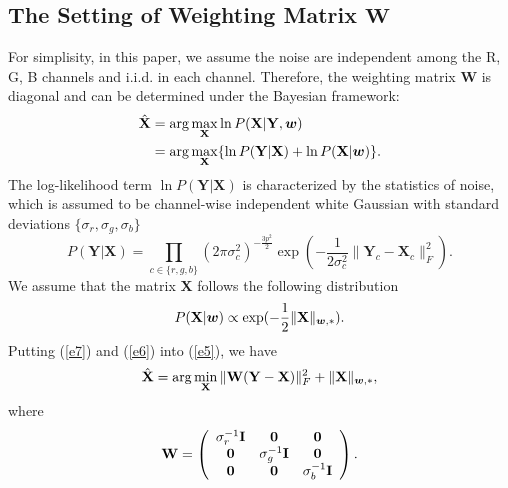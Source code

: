 \documentclass[10pt,twocolumn,letterpaper,sort&compress]{article}
\begin{document}
\subsection{The Setting of Weighting Matrix $\mathbf{W}$}
For simplisity, in this paper, we assume the noise are independent among the R, G, B channels and i.i.d. in each channel. Therefore, the weighting matrix $\mathbf{W}$ is diagonal and can be determined under the Bayesian framework:
\vspace{-1mm}
\begin{equation}
\label{e5}
\vspace{-1mm}
\begin{split}
\hat{\mathbf{X}} 
&=
\arg\max_{\mathbf{X}}\ln P(\mathbf{X}|\mathbf{Y},\bm{w})
\\
&
=
\arg\max_{\mathbf{X}}\{\ln P(\mathbf{Y}|\mathbf{X})+\ln P(\mathbf{X}|\bm{w})\}.
\end{split}
\end{equation}
The log-likelihood term $\ln P(\mathbf{Y}|\mathbf{X})$ is characterized by the
statistics of noise, which is assumed to be channel-wise independent white Gaussian with standard deviations $\{\sigma_{r}, \sigma_{g}, \sigma_{b}\}$
\vspace{-1mm}
\begin{equation}
\label{e6}
P(\mathbf{Y}|\mathbf{X}) 
= 
\prod_{c\in\{r, g, b\}}
(2\pi\sigma_{c}^{2})^{-\frac{3p^{2}}{2}}
\exp(-\frac{1}{2\sigma_{c}^{2}}\|\mathbf{Y}_{c}-\mathbf{X}_{c}\|_{F}^{2}).
\end{equation}
We assume that the matrix $\mathbf{X}$ follows the following distribution
\vspace{-1mm}
\begin{equation}
\label{e7}
\vspace{-1mm}
P(\mathbf{X}|\bm{w})
\propto
\exp(-\frac{1}{2}\|\mathbf{X}\|_{\bm{w},*}).
\end{equation}
Putting (\ref{e7}) and (\ref{e6}) into (\ref{e5}), we have
\vspace{-1mm}
\begin{equation}
\vspace{-1mm}
\hat{\mathbf{X}}=\arg\min_{\mathbf{X}}\|\mathbf{W}(\mathbf{Y}-\mathbf{X})\|_{F}^{2}+\|\mathbf{X}\|_{\bm{w},*},
\end{equation}
where
\begin{equation}
\label{e9}
\vspace{-1mm}
\mathbf{W}
=
\left( \begin{array}{ccc}
\sigma_{r}^{-1}\mathbf{I} & \mathbf{0} & \mathbf{0}
\\
\mathbf{0} & \sigma_{g}^{-1}\mathbf{I} & \mathbf{0}
\\
\mathbf{0} & \mathbf{0} & \sigma_{b}^{-1}\mathbf{I}
\end{array} \right).
\end{equation}
\end{document}
